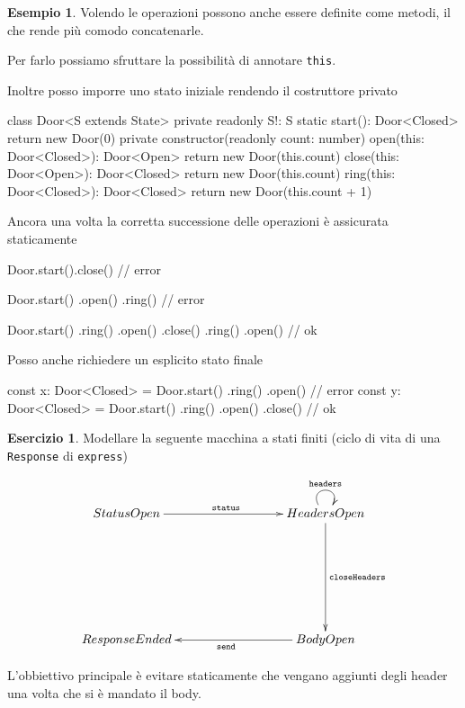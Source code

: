 \documentclass[12pt]{article}
\theoremstyle{definition}
\newtheorem{example}{Esempio}[subsection]
\newtheorem{exercise}{Esercizio}[subsection]
\newenvironment{code}
  {\vspace{0.5cm} \VerbatimEnvironment\begin{typescriptcode}}
  {\end{typescriptcode} \vspace{0.2cm}}
\begin{document}
\begin{example}
Volendo le operazioni possono anche essere definite come metodi, il che rende più comodo concatenarle.

Per farlo possiamo sfruttare la possibilità di annotare \texttt{this}.

Inoltre posso imporre uno stato iniziale rendendo il costruttore privato

\begin{code}
class Door<S extends State> {
  private readonly S!: S
  static start(): Door<Closed> {
    return new Door(0)
  }
  private constructor(readonly count: number) {}
  open(this: Door<Closed>): Door<Open> {
    return new Door(this.count)
  }
  close(this: Door<Open>): Door<Closed> {
    return new Door(this.count)
  }
  ring(this: Door<Closed>): Door<Closed> {
    return new Door(this.count + 1)
  }
}
\end{code}

Ancora una volta la corretta successione delle operazioni è assicurata staticamente

\begin{code}
Door.start().close() // error

Door.start()
  .open()
  .ring() // error

Door.start()
  .ring()
  .open()
  .close()
  .ring()
  .open() // ok
\end{code}

Posso anche richiedere un esplicito stato finale

\begin{code}
const x: Door<Closed> = Door.start()
  .ring()
  .open() // error
const y: Door<Closed> = Door.start()
  .ring()
  .open()
  .close() // ok
\end{code}
\end{example}

\begin{exercise}
Modellare la seguente macchina a stati finiti (ciclo di vita di una \texttt{Response} di \texttt{express})

\[
\xymatrixrowsep{3cm}
\xymatrixcolsep{3cm}
\xymatrix{
  StatusOpen \ar[r]^{\texttt{status}} & HeadersOpen \ar@(ul,ur)^{\texttt{headers}} \ar[d]^{\texttt{closeHeaders}} \\
  ResponseEnded & BodyOpen \ar[l]^{\texttt{send}} \\
}
\]

L'obbiettivo principale è evitare staticamente che vengano aggiunti degli header una volta che si è mandato il body.
\end{exercise}
\end{document}

